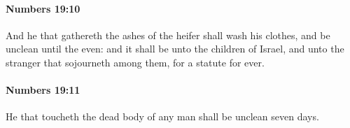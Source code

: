 		\paragraph{Numbers 19:10} %
			\label{NUMBERS-19-10}

			And he that gathereth the ashes of the heifer shall wash his clothes, and be unclean until the even: and it shall be unto the children of Israel, and unto the stranger that sojourneth among them, for a statute for ever.


		\paragraph{Numbers 19:11} %
			\label{NUMBERS-19-11}

			He that toucheth the dead body of any man shall be unclean seven days.


